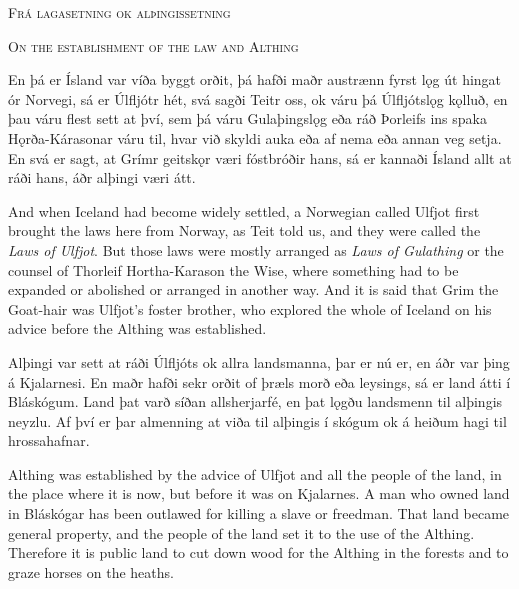 \begin{paracol}{2}
    \begin{center}
        \textsc{Frá lagasetning ok alþingissetning\footnotemark}
    \end{center}

    \switchcolumn

    \begin{center}
        \textsc{On the establishment of the law and Althing}
    \end{center}

    \switchcolumn*

    En þá er Ísland var víða byggt orðit, þá hafði maðr austrænn fyrst lǫg út hingat ór Norvegi, sá er Úlfljótr hét, svá sagði Teitr oss, ok váru þá Úlfljótslǫg kǫlluð, en þau váru flest sett at því, sem þá váru Gulaþingslǫg eða ráð Þorleifs ins spaka Hǫrða-Kárasonar váru til, hvar við skyldi auka eða af nema eða annan veg setja. En svá er sagt, at Grímr geitskǫr væri fóstbróðir hans, sá er kannaði Ísland allt at ráði hans, áðr alþingi væri átt.

    \switchcolumn

    And when Iceland had become widely settled, a Norwegian called Ulfjot first brought the laws here from Norway, as Teit told us, and they were called the \textit{Laws of Ulfjot}. But those laws were mostly arranged as \textit{Laws of Gulathing} or the counsel of Thorleif Hortha-Karason the Wise, where something had to be expanded or abolished or arranged in another way. And it is said that Grim the Goat-hair was Ulfjot's foster brother, who explored the whole of Iceland on his advice before the Althing was established.

    \switchcolumn*

    Alþingi var sett at ráði Úlfljóts ok allra landsmanna, þar er nú er, en áðr var þing á Kjalarnesi. En maðr hafði sekr orðit of þræls morð eða leysings, sá er land átti í Bláskógum. Land þat varð síðan allsherjarfé, en þat lǫgðu landsmenn til alþingis neyzlu. Af því er þar almenning at viða til alþingis í skógum ok á heiðum hagi til hrossahafnar.

    \switchcolumn

    Althing was established by the advice of Ulfjot and all the people of the land, in the place where it is now, but before it was on Kjalarnes. A man who owned land in Bláskógar has been outlawed for killing a slave or freedman. That land became general property, and the people of the land set it to the use of the Althing. Therefore it is public land to cut down wood for the Althing in the forests and to graze horses on the heaths.
\end{paracol}

